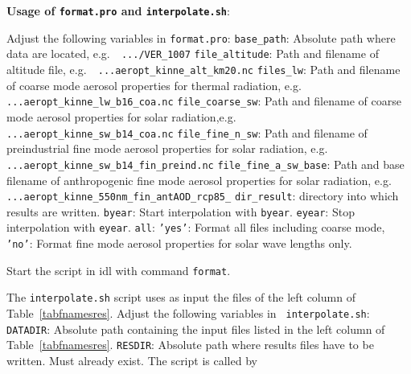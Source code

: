 \begin{appendix}
{\bf Usage of {\tt format.pro} and {\tt interpolate.sh}}:

Adjust the following variables in {\tt format.pro}:\newline
{\tt base\_path}: Absolute path where data are located, e.g.~{\tt
  .../VER\_1007}\newline
{\tt file\_altitude}: Path and filename of altitude file, \newline e.g.~{\tt
  ...aeropt\_kinne\_alt\_km20.nc} \newline
{\tt files\_lw}: Path and filename of coarse mode aerosol properties
for thermal radiation, \newline e.g. {\tt ...aeropt\_kinne\_lw\_b16\_coa.nc} \newline
{\tt file\_coarse\_sw}: Path and filename of coarse mode aerosol
properties for solar radiation,\newline e.g.~{\tt
  ...aeropt\_kinne\_sw\_b14\_coa.nc}\newline
{\tt file\_fine\_n\_sw}: Path and filename of preindustrial fine mode
aerosol properties for solar radiation, \newline e.g. {\tt
  ...aeropt\_kinne\_sw\_b14\_fin\_preind.nc}\newline
{\tt file\_fine\_a\_sw\_base}: Path and base filename of anthropogenic
fine mode aerosol properties for solar radiation, \newline e.g. {\tt
  ...aeropt\_kinne\_550nm\_fin\_antAOD\_rcp85\_}\newline
{\tt dir\_result}: directory into which results are written.\newline
{\tt byear}: Start interpolation with {\tt byear}.\newline
{\tt eyear}: Stop interpolation with {\tt eyear}.\newline
{\tt all}: {\tt 'yes'}: Format all files including coarse mode, {\tt
  'no'}: Format fine mode aerosol properties for solar wave lengths only.

Start the script in idl with command {\tt format}.

The {\tt interpolate.sh} script uses as input the files of the left
column of
Table~\ref{tabfnamesres}. Adjust the following variables in {\tt
  interpolate.sh}:\newline
{\tt DATADIR}: Absolute path containing the input files listed in the
left column of Table~\ref{tabfnamesres}.\newline
{\tt RESDIR}: Absolute path where results files have to be
written. Must already exist.\newline
The script is
called by


\end{appendix}
